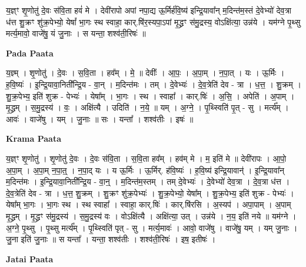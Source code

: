 \documentclass[17pt]{extarticle}
\begin{document}
य॒ज्ञ्ꣳ शृ॒णोतु॑ दे॒वः स॑वि॒ता हवं॑ मे । देवी॑रापो अपां नपा॒द्य ऊ॒र्मिर्ह॑वि॒ष्य॑ इन्द्रि॒यावा᳚न् म॒दिन्त॑म॒स्तं दे॒वेभ्यो॑ देव॒त्रा ध॑त्त शु॒क्रꣳ शु॑क्र॒पेभ्यो॒ येषां᳚ भा॒गः स्थ स्वाहा॒ कार्.षि॑र॒स्यपा॒ऽपां मृ॒द्ध्रꣳ स॑मु॒द्रस्य॒ वोऽक्षि॑त्या॒ उन्न॑ये । यम॑ग्ने पृ॒थ्सु मर्त्य॒मावो॒ वाजे॑षु॒ यं जु॒नाः । स यन्ता॒ शश्व॑ती॒रिषः॑ ॥ \newline

\textbf{Pada Paata} \newline

य॒ज्ञ्म् । शृ॒णोतु॑ । दे॒वः । स॒वि॒ता । हव᳚म् । मे॒ ॥ देवीः᳚ । आ॒पः॒ । अ॒पा॒म् । न॒पा॒त् । यः । ऊ॒र्मिः । ह॒वि॒ष्यः॑ । इ॒न्द्रि॒यावा॒निती᳚न्द्रि॒य - वा॒न् । म॒दिन्त॑मः । तम् । दे॒वेभ्यः॑ । दे॒व॒त्रेति॑ देव - त्रा । ध॒त्त॒ । शु॒क्रम् । शु॒क्र॒पेभ्य॒ इति॑ शुक्र - पेभ्यः॑ । येषा᳚म् । भा॒गः । स्थ । स्वाहा᳚ । कार्.षिः॑ । अ॒सि॒ । अपेति॑ । अ॒पाम् । मृ॒द्ध्रम् । स॒मु॒द्रस्य॑ । वः॒ । अक्षि॑त्यै । उदिति॑ । न॒ये॒ ॥ यम् । अ॒ग्ने॒ । पृ॒थ्स्विति॑ पृ॒त् - सु । मर्त्य᳚म् । आवः॑ । वाजे॑षु । यम् । जु॒नाः ॥ सः । यन्ता᳚ । शश्व॑तीः । इषः॑ ॥  \newline


\textbf{Krama Paata} \newline

य॒ज्ञ्ꣳ शृ॒णोतु॑ । शृ॒णोतु॑ दे॒वः । दे॒वः स॑वि॒ता । स॒वि॒ता हव᳚म् । हव॑म् मे । म॒ इति॑ मे ॥ देवी॑रापः । आ॒पो॒ अ॒पा॒म् । अ॒पा॒म् न॒पा॒त्॒ । न॒पा॒द् यः । य ऊ॒र्मिः । ऊ॒र्मिर्. ह॑वि॒ष्यः॑ । ह॒वि॒ष्य॑ इन्द्रि॒यावान्॑ । इ॒न्द्रि॒यावा᳚न् म॒दिन्त॑मः । इ॒न्द्रि॒यावा॒निती᳚न्द्रि॒य - वा॒न्॒ । म॒दिन्त॑म॒स्तम् । तम् दे॒वेभ्यः॑ । दे॒वेभ्यो॑ देव॒त्रा । दे॒व॒त्रा ध॑त्त । दे॒व॒त्रेति॑ देव - त्रा । ध॒त्त॒ शु॒क्रम् । शु॒क्रꣳ शु॑क्र॒पेभ्यः॑ । शु॒क्र॒पेभ्यो॒ येषा᳚म् । शु॒क्र॒पेभ्य॒ इति॑ शुक्र - पेभ्यः॑ । येषा᳚म् भा॒गः । भा॒गः स्थ । स्थ स्वाहा᳚ । स्वाहा॒ कार्.षिः॑ । कार्.षि॑रसि । अ॒स्यप॑ । अपा॒पाम् । अ॒पाम् मृ॒द्ध्रम् । मृ॒द्ध्रꣳ स॑मु॒द्रस्य॑ । स॒मु॒द्रस्य॑ वः । वोऽक्षि॑त्यै । अक्षि॑त्या॒ उत् । उन्न॑ये । न॒य॒ इति॑ नये ॥ यम॑ग्ने । अ॒ग्ने॒ पृ॒थ्सु । पृ॒थ्सु मर्त्य᳚म् । पृ॒थ्स्विति॑ पृत् - सु । मर्त्य॒मावः॑ । आवो॒ वाजे॑षु । वाजे॑षु॒ यम् । यम् जु॒नाः । जु॒ना इति॑ जु॒नाः ॥ स यन्ता᳚ । यन्ता॒ शश्व॑तीः । शश्व॑ती॒रिषः॑ । इष॒ इतीषः॑ । \newline

\textbf{Jatai Paata} \newline
\end{document}
